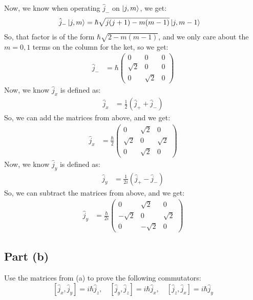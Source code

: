 \documentclass{article}
\begin{document}
Now, we know when operating  $\hat{j}_-$ on $\ket{j, m}$, we get:
\begin{align}
\hat{j}_- \ket{j, m} &= \hbar \sqrt{j(j+1) - m(m-1)} \ket{j, m-1}
\end{align}
So, that factor is of the form $\hbar\sqrt{2 - m(m-1)}$, and we only care about the $m = 0, 1$ terms  on the column for the ket, so we get:
\begin{align}
\hat{j}_- &= \hbar \begin{pmatrix}
0 & 0 & 0 \\
\sqrt{2} & 0 & 0 \\
0 & \sqrt{2} & 0
\end{pmatrix}
\end{align}
Now, we know $\hat{j}_x$ is defined as:
\begin{align}
\hat{j}_x &= \frac{1}{2} \left( \hat{j}_+ + \hat{j}_- \right)
\end{align}
So, we can add the matrices from above, and we get:
\begin{align}
\hat{j}_x &= \frac{\hbar}{2} \begin{pmatrix}
0 & \sqrt{2} & 0 \\
\sqrt{2} & 0 & \sqrt{2} \\
0 & \sqrt{2} & 0
\end{pmatrix}
\end{align}
Now, we know $\hat{j}_y$ is defined as:
\begin{align}
\hat{j}_y &= \frac{1}{2i} \left( \hat{j}_+ - \hat{j}_- \right)
\end{align}
So, we can subtract the matrices from above, and we get:
\begin{align}
\hat{j}_y &= \frac{\hbar}{2i} \begin{pmatrix}
0 & \sqrt{2} & 0 \\
- \sqrt{2} & 0 & \sqrt{2} \\
0 & - \sqrt{2} & 0
\end{pmatrix}
\end{align}

\subsection{Part (b)}
Use the matrices from (a) to prove the following commutators:
\[
[\hat{j}_x, \hat{j}_y] = i\hbar \hat{j}_z, \quad [\hat{j}_y, \hat{j}_z] = i\hbar \hat{j}_x, \quad [\hat{j}_z, \hat{j}_x] = i\hbar \hat{j}_y
\]
\end{document}
